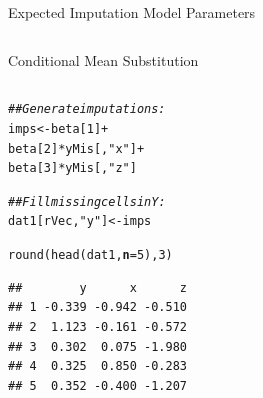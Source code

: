 \documentclass{beamer}\usepackage[]{graphicx}\usepackage[]{color}
\makeatletter
\newcommand{\hlnum}[1]{\textcolor[rgb]{0.69,0.494,0}{#1}}%
\newcommand{\hlstr}[1]{\textcolor[rgb]{0.749,0.012,0.012}{#1}}%
\newcommand{\hlcom}[1]{\textcolor[rgb]{0.514,0.506,0.514}{\textit{#1}}}%
\newcommand{\hlopt}[1]{\textcolor[rgb]{0,0,0}{#1}}%
\newcommand{\hlstd}[1]{\textcolor[rgb]{0,0,0}{#1}}%
\newcommand{\hlkwb}[1]{\textcolor[rgb]{0,0.341,0.682}{#1}}%
\newcommand{\hlkwc}[1]{\textcolor[rgb]{0,0,0}{\textbf{#1}}}%
\newcommand{\hlkwd}[1]{\textcolor[rgb]{0.004,0.004,0.506}{#1}}%
\newenvironment{kframe}{%
 \def\at@end@of@kframe{}%
 \ifinner\ifhmode%
  \def\at@end@of@kframe{\end{minipage}}%
  \begin{minipage}{\columnwidth}%
 \fi\fi%
 \def\FrameCommand##1{\hskip\@totalleftmargin \hskip-\fboxsep
 \colorbox{shadecolor}{##1}\hskip-\fboxsep
     \hskip-\linewidth \hskip-\@totalleftmargin \hskip\columnwidth}%
 \MakeFramed {\advance\hsize-\width
   \@totalleftmargin\z@ \linewidth\hsize
   \@setminipage}}%
 {\par\unskip\endMakeFramed%
 \at@end@of@kframe}
\newenvironment{knitrout}{}{} %
\makeatother
\begin{document}
\begin{frame}[fragile]{Expected Imputation Model Parameters}
\begin{columns}
\begin{column}{0.5\textwidth}
\begin{knitrout}
{}



\end{knitrout}
  
\end{column}
\end{columns}

\end{frame}


\begin{frame}[fragile]{Conditional Mean Substitution}

\begin{columns}
\begin{column}{0.5\textwidth}

\begin{knitrout}\footnotesize
{}\color{fgcolor}\begin{kframe}
\begin{alltt}
\hlcom{## Generate imputations:}
\hlstd{imps} \hlkwb{<-} \hlstd{beta[}\hlnum{1}\hlstd{]} \hlopt{+}
    \hlstd{beta[}\hlnum{2}\hlstd{]} \hlopt{*} \hlstd{yMis[ ,} \hlstr{"x"}\hlstd{]} \hlopt{+}
    \hlstd{beta[}\hlnum{3}\hlstd{]} \hlopt{*} \hlstd{yMis[ ,} \hlstr{"z"}\hlstd{]}

\hlcom{## Fill missing cells in Y:}
\hlstd{dat1[rVec,} \hlstr{"y"}\hlstd{]} \hlkwb{<-} \hlstd{imps}

\hlkwd{round}\hlstd{(}\hlkwd{head}\hlstd{(dat1,} \hlkwc{n} \hlstd{=} \hlnum{5}\hlstd{),} \hlnum{3}\hlstd{)}
\end{alltt}
\begin{verbatim}
##        y      x      z
## 1 -0.339 -0.942 -0.510
## 2  1.123 -0.161 -0.572
## 3  0.302  0.075 -1.980
## 4  0.325  0.850 -0.283
## 5  0.352 -0.400 -1.207
\end{verbatim}
\end{kframe}
\end{knitrout}

\end{column}
\begin{column}{0.5\textwidth}

\begin{knitrout}\footnotesize
{}\color{fgcolor}


\end{knitrout}
\end{column}
\end{columns}
\end{frame}
\end{document}
